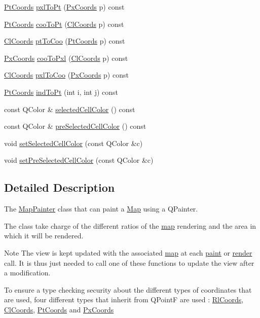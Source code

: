 \begin{DoxyCompactItemize}
\item 
\hyperlink{class_pt_coords}{Pt\+Coords} \hyperlink{class_map_painter_ad10215649aa1b27f74fe920163b0a2e4}{pxl\+To\+Pt} (\hyperlink{class_px_coords}{Px\+Coords} p) const
\item 
\hyperlink{class_pt_coords}{Pt\+Coords} \hyperlink{class_map_painter_a96f267f3fc328d3b79aa757ff8d9f84b}{coo\+To\+Pt} (\hyperlink{class_cl_coords}{Cl\+Coords} p) const
\item 
\hyperlink{class_cl_coords}{Cl\+Coords} \hyperlink{class_map_painter_a765fa150a2841eaf0e3a9d0689738049}{pt\+To\+Coo} (\hyperlink{class_pt_coords}{Pt\+Coords} p) const
\item 
\hyperlink{class_px_coords}{Px\+Coords} \hyperlink{class_map_painter_a5ea71fa57e033a7130b65b72bd7b0925}{coo\+To\+Pxl} (\hyperlink{class_cl_coords}{Cl\+Coords} p) const
\item 
\hyperlink{class_cl_coords}{Cl\+Coords} \hyperlink{class_map_painter_a8dc98c5badaf8ba46c2833d007a2b0b5}{pxl\+To\+Coo} (\hyperlink{class_px_coords}{Px\+Coords} p) const
\item 
\hyperlink{class_pt_coords}{Pt\+Coords} \hyperlink{class_map_painter_abe8b05f2893cedd9610b5c53b69a4530}{ind\+To\+Pt} (int i, int j) const
\item 
const Q\+Color \& \hyperlink{class_map_painter_a5669055f03fd84f772d77fd80de9b39f}{selected\+Cell\+Color} () const
\item 
const Q\+Color \& \hyperlink{class_map_painter_a2498d8b426f723fe980219ded809a5fa}{pre\+Selected\+Cell\+Color} () const
\item 
void \hyperlink{class_map_painter_ad1658d299eaee7ccdad70f00ad3f76d8}{set\+Selected\+Cell\+Color} (const Q\+Color \&c)
\item 
void \hyperlink{class_map_painter_a1c57806b863cd4b83051033681421cf6}{set\+Pre\+Selected\+Cell\+Color} (const Q\+Color \&c)
\end{DoxyCompactItemize}


\subsection{Detailed Description}
The \hyperlink{class_map_painter}{Map\+Painter} class that can paint a \hyperlink{class_map}{Map} using a Q\+Painter. 

The class take charge of the different ratios of the \hyperlink{class_map}{map} rendering and the area in which it will be rendered.

\begin{DoxyNote}{Note}
The view is kept updated with the associated \hyperlink{class_map}{map} at each \hyperlink{class_map_painter_a0deb552b94eff8f8751946928d7cd5b8}{paint} or \hyperlink{class_map_painter_a1c20cf03d0376290481bd80b9f8ef013}{render} call. It is thus just needed to call one of these functions to update the view after a modification.
\end{DoxyNote}
To ensure a type checking security about the different types of coordinates that are used, four different types that inherit from Q\+PointF are used \+: \hyperlink{class_rl_coords}{Rl\+Coords}, \hyperlink{class_cl_coords}{Cl\+Coords}, \hyperlink{class_pt_coords}{Pt\+Coords} and \hyperlink{class_px_coords}{Px\+Coords} 

